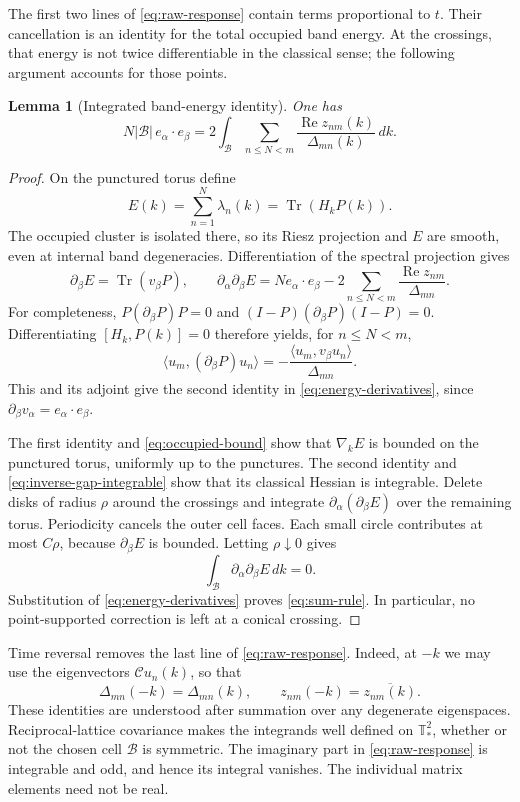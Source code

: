 \documentclass[11pt,a4paper]{article}
\newcommand{\B}{\mathcal B}
\newcommand{\T}{\mathbb T_{\!*}^{2}}
\newcommand{\ip}[2]{\langle #1,#2\rangle}
\DeclareMathOperator{\Tr}{Tr}
\DeclareMathOperator{\Ree}{Re}
\newtheorem{lemma}[lemma]{Lemma}
\numberwithin{equation}{section}
\begin{document}
The first two lines of \eqref{eq:raw-response} contain terms proportional
to $t$. Their cancellation is an identity for the total occupied band
energy. At the crossings, that energy is not twice differentiable in
the classical sense; the following argument accounts for those points.

\begin{lemma}[Integrated band-energy identity]\label{lem:sum-rule}
One has
\begin{equation}\label{eq:sum-rule}
 N|\B|\,e_\alpha\cdot e_\beta
 =2\int_\B\sum_{n\leq N<m}
 \frac{\Ree z_{nm}(k)}{\Delta_{mn}(k)}\,dk.
\end{equation}
\end{lemma}

\begin{proof}
On the punctured torus define
\[
 E(k)=\sum_{n=1}^N\lambda_n(k)=\Tr(H_kP(k)).
\]
The occupied cluster is isolated there, so its Riesz projection and
$E$ are smooth, even at internal band degeneracies. Differentiation of
the spectral projection gives
\begin{equation}\label{eq:energy-derivatives}
 \partial_\beta E=\Tr(v_\beta P),\qquad
 \partial_\alpha\partial_\beta E
 =N e_\alpha\cdot e_\beta
 -2\sum_{n\leq N<m}\frac{\Ree z_{nm}}{\Delta_{mn}}.
\end{equation}
For completeness, $P(\partial_\beta P)P=0$ and
$(I-P)(\partial_\beta P)(I-P)=0$. Differentiating $[H_k,P(k)]=0$
therefore yields, for $n\leq N<m$,
\[
 \ip{u_m}{(\partial_\beta P)u_n}
 =-\frac{\ip{u_m}{v_\beta u_n}}{\Delta_{mn}}.
\]
This and its adjoint give the second identity in
\eqref{eq:energy-derivatives}, since
$\partial_\beta v_\alpha=e_\alpha\cdot e_\beta$.

The first identity and \eqref{eq:occupied-bound} show that
$\nabla_k E$ is bounded on the punctured torus, uniformly up to the
punctures. The second
identity and \eqref{eq:inverse-gap-integrable} show that its classical
Hessian is integrable. Delete disks of radius $\rho$ around the
crossings and integrate $\partial_\alpha(\partial_\beta E)$ over the
remaining torus. Periodicity cancels the outer cell faces. Each small
circle contributes at most $C\rho$, because $\partial_\beta E$ is
bounded. Letting $\rho\downarrow0$ gives
\[
 \int_\B\partial_\alpha\partial_\beta E\,dk=0.
\]
Substitution of \eqref{eq:energy-derivatives} proves
\eqref{eq:sum-rule}. In particular, no point-supported correction is
left at a conical crossing.
\end{proof}

Time reversal removes the last line of \eqref{eq:raw-response}. Indeed,
at $-k$ we may use the eigenvectors $\mathcal C u_n(k)$, so that
\begin{equation}\label{eq:tr-matrix}
 \Delta_{mn}(-k)=\Delta_{mn}(k),\qquad
 z_{nm}(-k)=\overline{z_{nm}(k)}.
\end{equation}
These identities are understood after summation over any degenerate
eigenspaces. Reciprocal-lattice covariance makes the integrands
well defined on $\T$, whether or not the chosen cell $\B$ is symmetric.
The imaginary part in \eqref{eq:raw-response} is integrable and odd,
and hence its integral vanishes. The individual matrix elements need
not be real.
\end{document}
